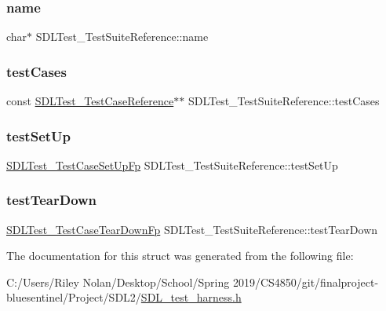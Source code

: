 \subsubsection{\texorpdfstring{name}{name}}
{\footnotesize\ttfamily char$\ast$ S\+D\+L\+Test\+\_\+\+Test\+Suite\+Reference\+::name}

\mbox{\label{struct_s_d_l_test___test_suite_reference_a06d97ce5bcf9ceb1300cc4aa39c028d3}} 
\subsubsection{\texorpdfstring{testCases}{testCases}}
{\footnotesize\ttfamily const \mbox{\hyperlink{struct_s_d_l_test___test_case_reference}{S\+D\+L\+Test\+\_\+\+Test\+Case\+Reference}}$\ast$$\ast$ S\+D\+L\+Test\+\_\+\+Test\+Suite\+Reference\+::test\+Cases}

\mbox{\label{struct_s_d_l_test___test_suite_reference_a8aa788b982efb93c93c2ab01202e0007}} 
\subsubsection{\texorpdfstring{testSetUp}{testSetUp}}
{\footnotesize\ttfamily \mbox{\hyperlink{_s_d_l__test__harness_8h_acf5b8d5c6dcbf946fdf7bdb1ceb03e45}{S\+D\+L\+Test\+\_\+\+Test\+Case\+Set\+Up\+Fp}} S\+D\+L\+Test\+\_\+\+Test\+Suite\+Reference\+::test\+Set\+Up}

\mbox{\label{struct_s_d_l_test___test_suite_reference_ad66abaf20653fd7361d28c69f88ac702}} 
\subsubsection{\texorpdfstring{testTearDown}{testTearDown}}
{\footnotesize\ttfamily \mbox{\hyperlink{_s_d_l__test__harness_8h_a146292b699bf0c95e1c4bcfaced3b1dc}{S\+D\+L\+Test\+\_\+\+Test\+Case\+Tear\+Down\+Fp}} S\+D\+L\+Test\+\_\+\+Test\+Suite\+Reference\+::test\+Tear\+Down}



The documentation for this struct was generated from the following file\+:\begin{DoxyCompactItemize}
\item 
C\+:/\+Users/\+Riley Nolan/\+Desktop/\+School/\+Spring 2019/\+C\+S4850/git/finalproject-\/bluesentinel/\+Project/\+S\+D\+L2/\mbox{\hyperlink{_s_d_l__test__harness_8h}{S\+D\+L\+\_\+test\+\_\+harness.\+h}}\end{DoxyCompactItemize}

